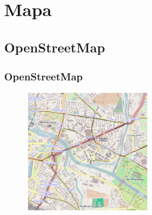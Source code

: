 \documentclass[slidestop, compress, 10pt]{beamer}
\begin{document}
\section{Mapa}

    \subsection{OpenStreetMap}
        \begin{frame}
            \frametitle{OpenStreetMap}
            \begin{figure}
                \includegraphics[width=200px]{osm.png}
            \end{figure}
        \end{frame}
\end{document}
